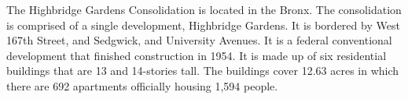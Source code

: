 The Highbridge Gardens Consolidation is located in the Bronx. The consolidation is comprised of a single development, Highbridge Gardens. It is bordered by West 167th Street, and Sedgwick, and University Avenues. It is a federal conventional development that finished construction in 1954. It is made up of six residential buildings that are 13 and 14-stories tall. The buildings cover 12.63 acres in which there are 692 apartments officially housing 1,594 people.